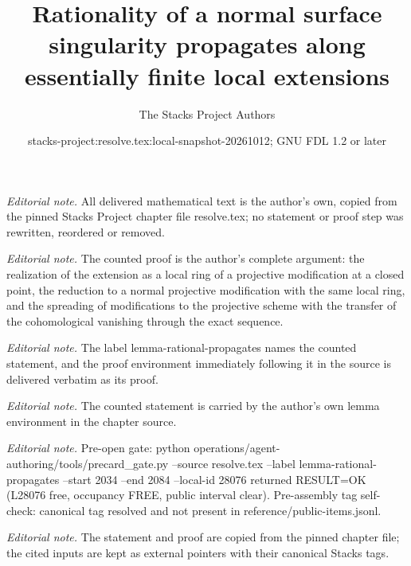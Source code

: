 \documentclass[10pt,a4paper]{amsart}
\title{Rationality of a normal surface singularity propagates along essentially finite local extensions}
\author{The Stacks Project Authors}
\date{stacks-project:resolve.tex:local-snapshot-20261012; GNU FDL 1.2 or later}
\theoremstyle{plain}
\theoremstyle{definition}
\theoremstyle{remark}
\numberwithin{equation}{subsection}
\begin{document}
\maketitle
\noindent\textit{Editorial note.} All delivered mathematical text is the author's own, copied from the pinned Stacks Project chapter file resolve.tex; no statement or proof step was rewritten, reordered or removed.\par\medskip
\noindent\textit{Editorial note.} The counted proof is the author's complete argument: the realization of the extension as a local ring of a projective modification at a closed point, the reduction to a normal projective modification with the same local ring, and the spreading of modifications to the projective scheme with the transfer of the cohomological vanishing through the exact sequence.\par\medskip
\noindent\textit{Editorial note.} The label lemma-rational-propagates names the counted statement, and the proof environment immediately following it in the source is delivered verbatim as its proof.\par\medskip
\noindent\textit{Editorial note.} The counted statement is carried by the author's own lemma environment in the chapter source.\par\medskip
\noindent\textit{Editorial note.} Pre-open gate: python operations/agent-authoring/tools/precard\_gate.py --source resolve.tex --label lemma-rational-propagates --start 2034 --end 2084 --local-id 28076 returned RESULT=OK (L28076 free, occupancy FREE, public interval clear). Pre-assembly tag self-check: canonical tag resolved and not present in reference/public-items.jsonl.\par\medskip
\noindent\textit{Editorial note.} The statement and proof are copied from the pinned chapter file; the cited inputs are kept as external pointers with their canonical Stacks tags.\par\medskip
\end{document}
